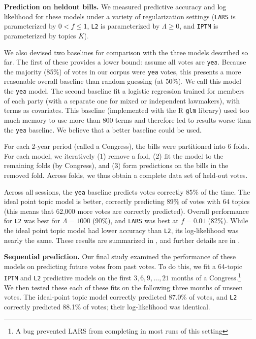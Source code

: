 \textbf{Prediction on heldout bills.}  We measured predictive accuracy
and log likelihood for these models under a variety of regularization
settings (\verb!LARS! is parameterized by $0 < f \le 1$, \verb!L2! is
parameterized by $\Lambda \ge 0$, and \verb!IPTM! is parameterized by
topics $K$).

We also devised two baselines for comparison with the three models
described so far.  The first of these provides a lower bound: assume
all votes are \verb!yea!.  Because the majority (85\%) of votes in our
corpus were \verb!yea! votes, this presents a more reasonable overall
baseline than random guessing (at 50\%).  We call this model the
\verb!yea!  model.  The second baseline fit a logistic regression
trained for members of each party (with a separate one for mixed or
independent lawmakers), with terms as covariates.  This baseline
(implemented with the R \verb!glm! library) used too much memory to
use more than 800 terms and therefore led to results worse than the
\verb!yea!  baseline.  We believe that a better baseline could be used.

For each 2-year period (called a Congress), the bills were partitioned
into 6 folds.  For each model, we iteratively (1) remove a fold, (2)
fit the model to the remaining folds (by Congress), and (3) form
predictions on the bills in the removed fold.  Across folds, we thus
obtain a complete data set of held-out votes.

Across all sessions, the \verb!yea! baseline predicts votes correctly
85\% of the time.  The ideal point topic model is better, correctly
predicting 89\% of votes with 64 topics (this means that 62,000 more
votes are correctly predicted).  Overall performance for \verb!L2! was
best for $\Lambda=1000$ (90\%), and \verb!LARS! was best at $f=0.01$
(82\%).  While the ideal point topic model had lower accuracy than
\verb!L2!, its log-likelihood was nearly the same.  These results are
summarized in , and further details are in
.

\textbf{Sequential prediction.}  Our final study examined the
performance of these models on predicting future votes from past
votes.  To do this, we fit a 64-topic \verb!IPTM! and \verb!L2!
predictive models on the first $3, 6, 9, \ldots, 21$ months of a
Congress.\footnote{A bug prevented LARS from completing in most runs of
this setting}  We then tested these each of these fits on the
following three months of unseen votes.  The ideal-point topic model
correctly predicted $87.0\%$ of votes, and \verb!L2!  correctly
predicted 88.1\% of votes; their log-likelihood was identical.


